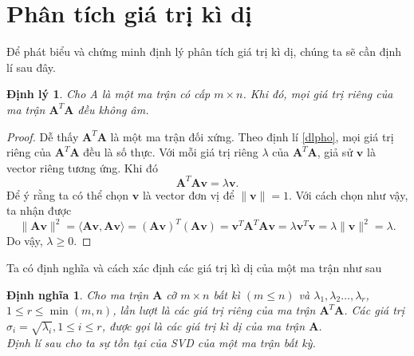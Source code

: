 \documentclass[12pt,a4paper,oneside]{report}
\newtheorem{dl}{Định lý}[section]
\newtheorem{dn}{Định nghĩa}[section]
\numberwithin{equation}{section}
\begin{document}
\section{Phân tích giá trị kì dị}
Để phát biểu và chứng minh định lý phân tích giá trị kì dị, chúng ta sẽ cần định lí sau đây.
\begin{dl} \cite{lay1994} \label{dl_1} Cho A là một ma trận có cấp $m \times n$. Khi đó, mọi giá trị riêng của ma trận $\mathbf{A}^{T} \mathbf{A}$ đều không âm.
\end{dl}
\begin{proof}
Dễ thấy $\mathbf{A}^{T} \mathbf{A}$ là một ma trận đối xứng. Theo định lí \ref{dlpho}, mọi giá trị riêng của $\mathbf{A}^{T} \mathbf{A}$ đều là số thực. Với mỗi giá trị riêng $\lambda$ của $\mathbf{A}^{T} \mathbf{A}$, giả sử $\mathbf{v}$ là vector riêng tương ứng. Khi đó
\begin{equation} \label{eq1}
\mathbf{A}^{T} \mathbf{A} \mathbf{v}=\lambda \mathbf{v}.
\end{equation}
Để ý rằng ta có thể chọn $\mathbf{v}$ là vector đơn vị để $\|\mathbf{v}\|=1$. Với cách chọn như vậy, ta nhận được
\begin{equation} \label{eq2}
\|\mathbf{A} \mathbf{v}\|^{2}=\langle\mathbf{A} \mathbf{v}, \mathbf{A v}\rangle=(\mathbf{A v})^{T}(\mathbf{A v})=\mathbf{v}^{T} \mathbf{A}^{T} \mathbf{A} \mathbf{v}=\lambda \mathbf{v}^{T} \mathbf{v}=\lambda\|\mathbf{v}\|^{2}=\lambda.
\end{equation}
Do vậy, $\lambda \geqslant 0$.
\end{proof}
Ta có định nghĩa và cách xác định các giá trị kì dị của một ma trận như sau
\begin{dn}\rm Cho ma trận $\mathbf{A}$ cỡ $m \times n$ bất kì $(m \leqslant n)$ và $\lambda_{1}, \lambda_{2} \ldots, \lambda_{r}$, $1 \leqslant r \leqslant \min (m, n)$, lần lượt là các giá trị riêng của ma trận $\mathbf{A}^{T} \mathbf{A}$. Các giá trị $\sigma_{i}=\sqrt{\lambda_{i}}, 1 \leqslant i \leqslant r$, được gọi là các giá trị kì dị của ma trận $\mathbf{A}$.\\
Định lí sau cho ta sự tồn tại của SVD của một ma trận bất kỳ.
\end{dn}
\end{document}
